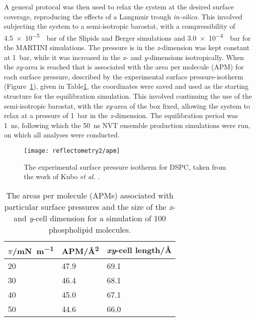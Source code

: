 A general protocal was then used to relax the system at the desired surface coverage, reproducing the effects of a Langmuir trough \emph{in-silico}.
This involved subjecting the system to a semi-isotropic barostat, with a compressibility of \SI{4.5e-5}{\per\bar} of the Slipids and Berger simulations and \SI{3.0e-4}{\per\bar} for the MARTINI simulations.
The pressure is in the \emph{z}-dimension was kept constant at \SI{1}{\bar}, while it was increased in the \emph{x}- and \emph{y}-dimensions isotropically.
When the \emph{xy}-area is reached that is associated with the area per molecule (APM) for each surface pressure, described by the experimental surface pressure-isotherm (Figure~\ref{fig:surfiso}), given in Table\ref{tab:apm}, the coordinates were saved and used as the starting structure for the equilibration simulation.
This involved continuing the use of the semi-isotropic barostat, with the \emph{xy}-area of the box fixed, allowing the system to relax at a pressure of \SI{1}{\bar} in the \emph{z}-dimension.
The equilibration period was \SI{1}{\nano\second}, following which the \SI{50}{\nano\second} NVT ensemble production simulations were run, on which all analyses were conducted.
%
\begin{figure}
    \centering
    \texttt{[image: reflectometry2/apm]}
    \caption{The experimental surface pressure isotherm for DSPC, taken from the work of Kubo \emph{et al.} \cite{kubo_phosphatidylcholine_2001}.}
    \label{fig:surfiso}
\end{figure}
%
%
\begin{table}
    \centering
    \small
    \caption{The areas per molecule (APMs) associated with particular surface pressures and the size of the \emph{x}- and \emph{y}-cell dimension for a simulation of 100 phospholipid molecules.}
    \label{tab:apm}
    \begin{tabular}{l | l l}
        \toprule
        $\pi$/\si{\milli\newton\per\meter} & APM/\si{\angstrom\squared} & \emph{xy}-cell length/\si{\angstrom} \\
        \midrule
        \num{20} & \num{47.9} & \num{69.1} \\
        \num{30} & \num{46.4} & \num{68.1} \\
        \num{40} & \num{45.0} & \num{67.1} \\
        \num{50} & \num{44.6} & \num{66.0} \\
        \bottomrule
    \end{tabular}
\end{table}
%

